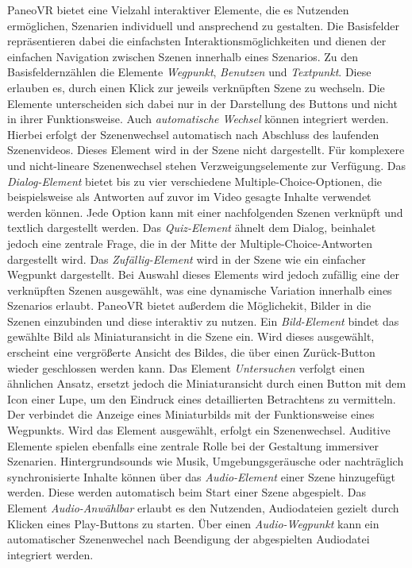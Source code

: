 PaneoVR bietet eine Vielzahl interaktiver Elemente, die es Nutzenden ermöglichen, Szenarien individuell und ansprechend zu gestalten. Die Basisfelder repräsentieren dabei die einfachsten Interaktionsmöglichkeiten und dienen der einfachen Navigation zwischen Szenen innerhalb eines Szenarios. Zu den Basisfeldernzählen die Elemente \textit{Wegpunkt}, \textit{Benutzen} und \textit{Textpunkt}. Diese erlauben es, durch einen Klick zur jeweils verknüpften Szene zu wechseln. Die Elemente unterscheiden sich dabei nur in der Darstellung des Buttons und nicht in ihrer Funktionsweise. Auch \textit{automatische Wechsel} können integriert werden. Hierbei erfolgt der Szenenwechsel automatisch nach Abschluss des laufenden Szenenvideos. Dieses Element wird in der Szene nicht dargestellt. 
Für komplexere und nicht-lineare Szenenwechsel stehen Verzweigungselemente zur Verfügung. Das \textit{Dialog-Element} bietet bis zu vier verschiedene Multiple-Choice-Optionen, die beispielsweise als Antworten auf zuvor im Video gesagte Inhalte verwendet werden können. Jede Option kann mit einer nachfolgenden Szenen verknüpft und textlich dargestellt werden. Das \textit{Quiz-Element} ähnelt dem Dialog, beinhalet jedoch eine zentrale Frage, die in der Mitte der  Multiple-Choice-Antworten dargestellt wird. Das \textit{Zufällig-Element} wird in der Szene wie ein einfacher Wegpunkt dargestellt. Bei Auswahl dieses Elements wird jedoch zufällig eine der verknüpften Szenen ausgewählt, was eine dynamische Variation innerhalb eines Szenarios erlaubt.
PaneoVR bietet außerdem die Möglichekit, Bilder in die Szenen einzubinden und diese interaktiv zu nutzen. Ein \textit{Bild-Element} bindet das gewählte Bild als Miniaturansicht in die Szene ein. Wird dieses ausgewählt, erscheint eine vergrößerte Ansicht des Bildes, die über einen Zurück-Button wieder geschlossen werden kann. Das Element \textit{Untersuchen} verfolgt einen ähnlichen Ansatz, ersetzt jedoch die Miniaturansicht durch einen Button mit dem Icon einer Lupe, um den Eindruck eines detaillierten Betrachtens zu vermitteln. Der  verbindet die Anzeige eines Miniaturbilds mit der Funktionsweise eines Wegpunkts. Wird das Element ausgewählt, erfolgt ein Szenenwechsel. 
Auditive Elemente spielen ebenfalls eine zentrale Rolle bei der Gestaltung immersiver Szenarien. Hintergrundsounds wie Musik, Umgebungsgeräusche oder nachträglich synchronisierte Inhalte können über das \textit{Audio-Element} einer Szene hinzugefügt werden. Diese werden automatisch beim Start einer Szene abgespielt. Das Element \textit{Audio-Anwählbar} erlaubt es den Nutzenden, Audiodateien gezielt durch Klicken eines Play-Buttons zu starten. Über einen \textit{Audio-Wegpunkt} kann ein automatischer Szenenwechel nach Beendigung der abgespielten Audiodatei integriert werden. 
